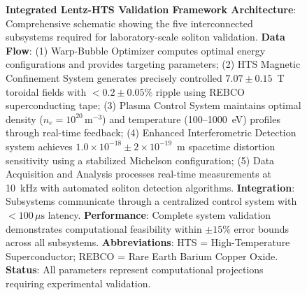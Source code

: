 \documentclass[12pt,a4paper]{article}
\begin{document}
\begin{figure}[htbp]
\centering
{}
\caption{\textbf{Integrated Lentz-HTS Validation Framework Architecture}: Comprehensive schematic showing the five interconnected subsystems required for laboratory-scale soliton validation. \textbf{Data Flow}: (1) Warp-Bubble Optimizer computes optimal energy configurations and provides targeting parameters; (2) HTS Magnetic Confinement System generates precisely controlled $7.07\pm0.15$~T toroidal fields with $<0.2\pm0.05\%$ ripple using REBCO superconducting tape; (3) Plasma Control System maintains optimal density ($n_e = 10^{20}\,\mathrm{m}^{-3}$) and temperature (100--1000~eV) profiles through real-time feedback; (4) Enhanced Interferometric Detection system achieves $1.0\times10^{-18}\pm2\times10^{-19}$~m spacetime distortion sensitivity using a stabilized Michelson configuration; (5) Data Acquisition and Analysis processes real-time measurements at 10~kHz with automated soliton detection algorithms. \textbf{Integration}: Subsystems communicate through a centralized control system with $<100\,\mu\mathrm{s}$ latency. \textbf{Performance}: Complete system validation demonstrates computational feasibility within $\pm15\%$ error bounds across all subsystems. \textbf{Abbreviations}: HTS = High-Temperature Superconductor; REBCO = Rare Earth Barium Copper Oxide. \textbf{Status}: All parameters represent computational projections requiring experimental validation.}
\label{fig:framework}
\end{figure}
\end{document}
